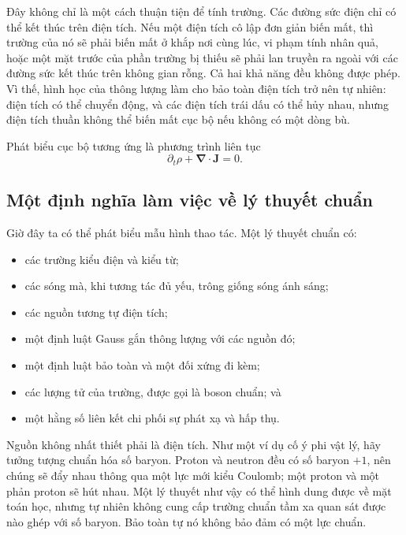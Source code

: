 Đây không chỉ là một cách thuận tiện để tính trường. Các đường sức điện chỉ có thể kết thúc trên điện tích. Nếu một điện tích cô lập đơn giản biến mất, thì trường của nó sẽ phải biến mất ở khắp nơi cùng lúc, vi phạm tính nhân quả, hoặc một mặt trước của phần trường bị thiếu sẽ phải lan truyền ra ngoài với các đường sức kết thúc trên không gian rỗng. Cả hai khả năng đều không được phép. Vì thế, hình học của thông lượng làm cho bảo toàn điện tích trở nên tự nhiên: điện tích có thể chuyển động, và các điện tích trái dấu có thể hủy nhau, nhưng điện tích thuần không thể biến mất cục bộ nếu không có một dòng bù.

Phát biểu cục bộ tương ứng là phương trình liên tục
\begin{equation}
\partial_t\rho+\boldsymbol\nabla\cdot\boldsymbol J=0.
\label{eq:l5-continuity}
\end{equation}

\subsection{Một định nghĩa làm việc về lý thuyết chuẩn}

Giờ đây ta có thể phát biểu mẫu hình thao tác. Một lý thuyết chuẩn có:
\begin{itemize}
\item các trường kiểu điện và kiểu từ;
\item các sóng mà, khi tương tác đủ yếu, trông giống sóng ánh sáng;
\item các nguồn tương tự điện tích;
\item một định luật Gauss gắn thông lượng với các nguồn đó;
\item một định luật bảo toàn và một đối xứng đi kèm;
\item các lượng tử của trường, được gọi là boson chuẩn; và
\item một hằng số liên kết chi phối sự phát xạ và hấp thụ.
\end{itemize}
Nguồn không nhất thiết phải là điện tích. Như một ví dụ cố ý phi vật lý, hãy tưởng tượng chuẩn hóa số baryon. Proton và neutron đều có số baryon \(+1\), nên chúng sẽ đẩy nhau thông qua một lực mới kiểu Coulomb; một proton và một phản proton sẽ hút nhau. Một lý thuyết như vậy có thể hình dung được về mặt toán học, nhưng tự nhiên không cung cấp trường chuẩn tầm xa quan sát được nào ghép với số baryon. Bảo toàn tự nó không bảo đảm có một lực chuẩn.

